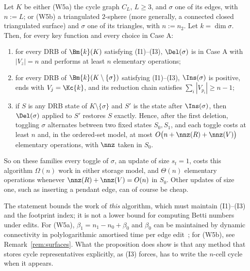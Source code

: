 \begin{proposition}\label{prop:nonlocal}
Let $K$ be either (W5a) the cycle graph $C_L$, $L\ge3$, and $\sigma$ one of its
edges, with $n:=L$; or (W5b) a triangulated $2$-sphere (more generally, a
connected closed triangulated surface) and $\sigma$ one of its triangles, with
$n:=n_2$. Let $k=\dim\sigma$. Then, for every key function and every choice in
Case A:
\begin{enumerate}
\item[(a)] for every DRB of $\Bm{k}(K)$ satisfying (I1)--(I3), $\Del(\sigma)$ is in
  Case A with $|V_z|=n$ and performs at least $n$ elementary operations;
\item[(b)] for every DRB of $\Bm{k}(K\setminus\{\sigma\})$ satisfying
  (I1)--(I3), $\Ins(\sigma)$ is positive, ends with $V_j=\Kc{k}$, and its
  reduction chain satisfies $\sum_i|V_{p_i}|\ge n-1$;
\item[(c)] if $S$ is any DRB state of $K\setminus\{\sigma\}$ and $S'$ is the state
  after $\Ins(\sigma)$, then $\Del(\sigma)$ applied to $S'$ restores $S$ exactly.
  Hence, after the first deletion, toggling $\sigma$ alternates between two fixed
  states $S_0,S_1$, and each toggle costs at least $n$ and, in the ordered-set
  model, at most $O\bigl(n+\nnz(R)+\nnz(V)\bigr)$ elementary operations, with
  $\nnz$ taken in $S_0$.
\end{enumerate}
So on these families every toggle of $\sigma$, an update of size $s_t=1$,
costs this algorithm $\Omega(n)$ work in either storage model, and $\Theta(n)$
elementary operations whenever $\nnz(R)+\nnz(V)=O(n)$ in $S_0$. Other updates of
size one, such as inserting a pendant edge, can of course be cheap.
\end{proposition}

The statement bounds the work of \emph{this} algorithm, which must maintain
(I1)--(I3) and the footprint index; it is not a lower bound for computing Betti
numbers under edits. For (W5a), $\beta_1=n_1-n_0+\beta_0$ and $\beta_0$ can be
maintained by dynamic connectivity in polylogarithmic amortised time per edge
edit~\cite{holm2001polylog}; for (W5b), see Remark~\ref{rem:surfaces}. What the
proposition does show is that any method that stores cycle representatives
explicitly, as (I3) forces, has to write the $n$-cell cycle when it appears.

